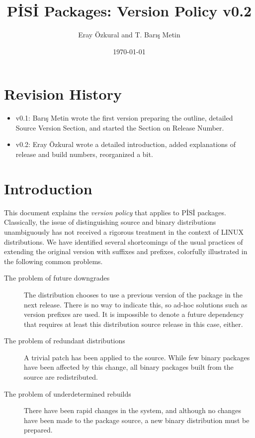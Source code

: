 \documentclass[a4paper,11pt]{article}
\title{P\.IS\.I Packages: Version Policy v0.2}
\date{\today}
\author{Eray \"Ozkural and T. Bar\i{}\c s Metin}
\begin{document}
\maketitle

\section*{Revision History}
\begin{itemize}
\item v0.1: Bar\i\c s Metin wrote the first version preparing the outline,
detailed Source Version Section, and started the Section on Release Number.
\item v0.2: Eray \"Ozkural wrote a detailed introduction, added
  explanations of release and build numbers, reorganized a bit.
\end{itemize}

\section{Introduction}

This document explains the \emph{version policy} that applies to
P\.IS\.I packages. Classically, the issue of distinguishing source and
binary distributions unambiguously has not received a rigorous
treatment in the context of LINUX distributions. We have identified
several shortcomings of the usual practices of extending the original
version with suffixes and prefixes, colorfully illustrated in the
following common problems.

\begin{description}

\item[The problem of future downgrades]
The distribution chooses to use a previous version of the package in
the next release. There is no way to indicate this, so ad-hoc
solutions such as version prefixes are used. It is
impossible to denote a future dependency that requires at least this
distribution source release in this case, either.

\item[The problem of redundant distributions]
A trivial patch has been applied to the source. While few binary
packages have been affected by this change, all binary packages
built from the source are redistributed.

\item[The problem of underdetermined rebuilds]
There have been rapid changes in the system, and although no
changes have been made to the package source, a new binary
distribution must be prepared.

\end{description}
\end{document}
